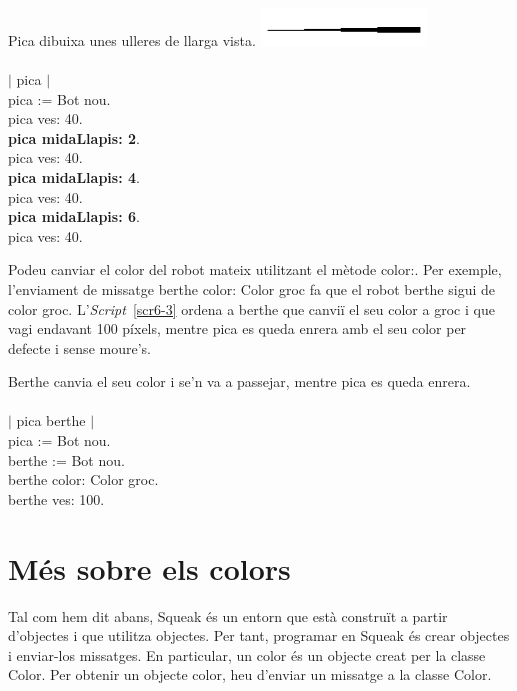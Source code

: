 \begin{script}  Pica dibuixa unes ulleres de llarga vista.
\newline
\newline
\noindent
\includegraphics[height=10mm ,width=44mm]{Imatges/figuraS6-2.png} 
\noindent
\textsf{\upshape
\\
\\$|$ pica $|$\\
pica := Bot nou.\\
pica ves: 40.\\
{\bfseries pica midaLlapis: 2}.\\
pica ves: 40.\\
{\bfseries pica midaLlapis: 4}.\\
pica ves: 40.\\
{\bfseries pica midaLlapis: 6}.\\
pica ves: 40.\\
}
\label{scr6-2}
\end{script}

Podeu canviar el color del robot mateix utilitzant el mètode \textsf{color:}. Per exemple, l'enviament de missatge \textsf{berthe color: Color groc} fa que el robot \textsf{berthe} sigui de color groc. L'\emph{Script}~\ref{scr6-3} ordena a \textsf{berthe} que canviï el seu color a groc i que vagi endavant 100 píxels, mentre \textsf{pica} es queda enrera amb el seu color per defecte i sense moure's. 


\newpage

\begin{script}  Berthe canvia el seu color i se'n va a passejar, mentre pica es queda enrera.
\textsf{\upshape
\\
\\$|$ pica berthe $|$\\
pica := Bot nou.\\
berthe := Bot nou.\\
berthe color: Color groc.\\
berthe ves: 100.\\
}
\label{scr6-3}
\end{script}

\section{Més sobre els colors}
Tal com hem dit abans, Squeak és un entorn que està construït a partir d'objectes i que utilitza objectes. Per tant, programar en Squeak és crear objectes i enviar-los missatges. En particular, un \textsf{color} és un objecte creat per la classe \textsf{Color}. Per obtenir un objecte color, heu d'enviar un missatge a la classe \textsf{Color}.

